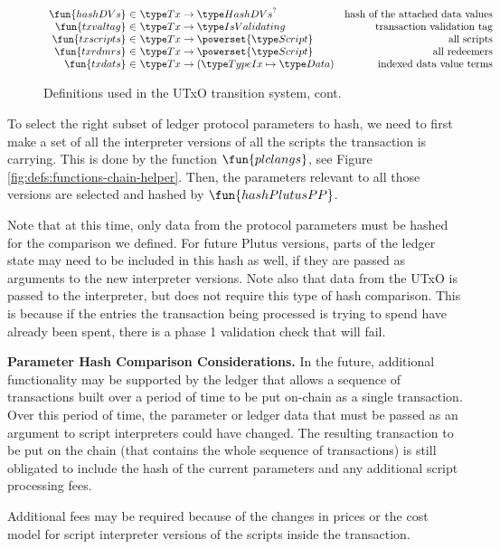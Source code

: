\begin{figure*}[htb]
\begin{equation*}
\begin{array}{r@{~\in~}lr}
      \fun{hashDVs} & \Tx \to \HashDVs^? & \text{hash of the attached data values}\\
      \fun{txvaltag} & \Tx \to \IsValidating & \text{transaction validation tag}\\
      \fun{txscripts} & \Tx \to \powerset{\Script} & \text{all scripts}\\
      \fun{txrdmrs} & \Tx \to \powerset{\Script} & \text{all redeemers}\\
      \fun{txdats} & \Tx \to (\TypeIx \mapsto \Data) & \text{indexed data value terms}\\
    \end{array}
  \end{equation*}
  \caption{Definitions used in the UTxO transition system, cont.}
  \label{fig:defs:utxo-shelley-2}
\end{figure*}

To select the right subset of ledger protocol parameters to hash, we need to
first make a set of all the interpreter versions of all the scripts the
transaction is carrying. This is done by the function $\fun{plclangs}$,
see Figure \ref{fig:defs:functions-chain-helper}. Then, the parameters
relevant to all those versions are selected and hashed by $\fun{hashPlutusPP}$.

Note that at this time, only data from the protocol parameters must be hashed
for the comparison we defined. For future Plutus versions, parts of the ledger
state may need to be included in this hash as well, if they are passed as
arguments to the new interpreter versions. Note also that data from the UTxO
is passed to the interpreter, but does not require this type of hash comparison.
This is because if the entries the transaction being processed is trying to
spend have already been spent, there is a phase 1 validation check that
will fail.

\textbf{Parameter Hash Comparison Considerations.}
In the future, additional functionality may be supported by the ledger that
allows a sequence of transactions built over a period of time to be put on-chain
as a single transaction. Over this period of time, the parameter or ledger
data that must be passed as an argument to script interpreters could have changed.
The resulting transaction to be put on the chain (that contains the whole sequence of
transactions) is still obligated to include the hash of the current parameters
and any additional script processing fees.

Additional fees may be required because of the changes in prices or the cost model
for script interpreter versions of the scripts inside the transaction.

